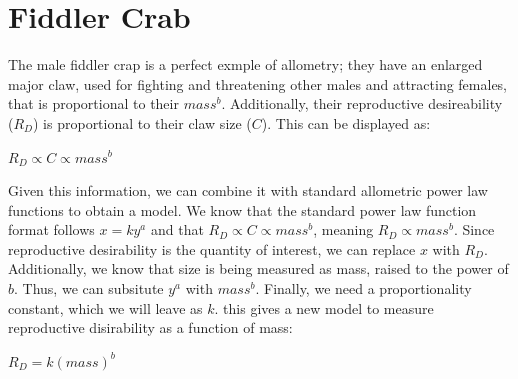 \documentclass[10pt,letterpaper]{article}
\begin{document}
	\section{Fiddler Crab}
		The male fiddler crap is a perfect exmple of allometry; they have an enlarged major claw, used for fighting and threatening other males and attracting females, that is proportional to their $mass^{b}$. Additionally, their reproductive desireability ($R_{D}$) is proportional to their claw size ($C$). This can be displayed as:
		\newline \newline
		\centerline{$R_{D} \propto C \propto mass^{b}$}
		\newline \newline
		Given this information, we can combine it with standard allometric power law functions to obtain a model. We know that the standard power law function format follows $x = ky^{a}$ and that $R_{D} \propto C \propto mass^{b}$, meaning $R_{D} \propto mass^{b}$. Since reproductive desirability is the quantity of interest, we can replace $x$ with $R_{D}$. Additionally, we know that size is being measured as mass, raised to the power of $b$. Thus, we can subsitute $y^{a}$ with $mass^{b}$. Finally, we need a proportionality constant, which we will leave as $k$. this gives a new model to measure reproductive disirability as a function of mass:
		\newline \newline
		\centerline{$R_{D} = k (mass)^{b}$}
\end{document}
